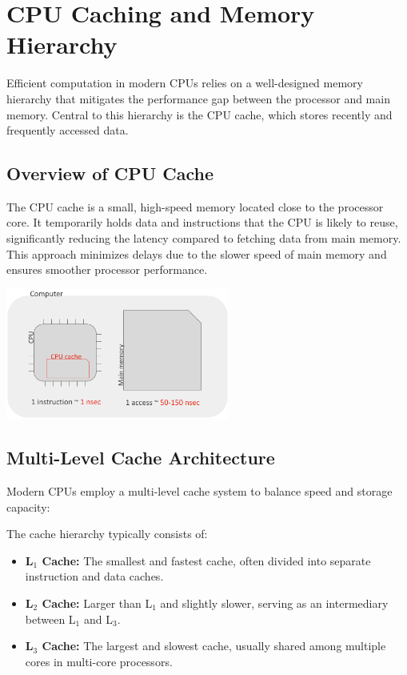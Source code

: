 \documentclass[../../compsys.tex]{subfiles}
\begin{document}
\section{CPU Caching and Memory Hierarchy}
Efficient computation in modern CPUs relies on a well-designed memory hierarchy that mitigates the performance gap between the processor and main memory. Central to this hierarchy is the CPU cache, which stores recently and frequently accessed data.

\subsection{Overview of CPU Cache}
The CPU cache is a small, high-speed memory located close to the processor core. It temporarily holds data and instructions that the CPU is likely to reuse, significantly reducing the latency compared to fetching data from main memory. This approach minimizes delays due to the slower speed of main memory and ensures smoother processor performance.
\begin{center}
  \includegraphics[width=0.55\textwidth]{chapters/L4/images/cpu-cache.png}
\end{center}

\subsection{Multi-Level Cache Architecture}
Modern CPUs employ a multi-level cache system to balance speed and storage capacity:

\begin{definition}
The cache hierarchy typically consists of:
\begin{itemize}
    \item \textbf{L\(_1\) Cache:} The smallest and fastest cache, often divided into separate instruction and data caches.
    \item \textbf{L\(_2\) Cache:} Larger than L\(_1\) and slightly slower, serving as an intermediary between L\(_1\) and L\(_3\).
    \item \textbf{L\(_3\) Cache:} The largest and slowest cache, usually shared among multiple cores in multi-core processors.
\end{itemize}
\end{definition}
\end{document}
